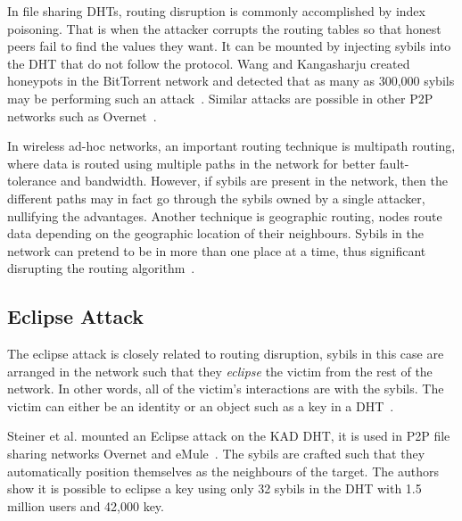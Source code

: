 In file sharing DHTs, routing disruption is commonly
accomplished by index poisoning. That is when the attacker corrupts the routing
tables so that honest peers fail to find the values they want. It can be mounted
by injecting sybils into the DHT that do not follow the protocol. Wang and
Kangasharju created honeypots in the BitTorrent network and detected that as
many as 300,000 sybils may be performing such an attack~\cite{wang2012real}.
Similar attacks are possible in other P2P networks such as
Overnet~\cite{liang2006index}.

In wireless ad-hoc networks, an important routing technique is multipath
routing, where data is routed using multiple paths in the network for better
fault-tolerance and bandwidth. However, if sybils are present in the network,
then the different paths may in fact go through the sybils owned by a single
attacker, nullifying the advantages. Another technique is geographic routing,
nodes route data depending on the geographic location of their neighbours.
Sybils in the network can pretend to be in more than one place at a time, thus
significant disrupting the routing algorithm~\cite{karlof2003secure}.

\subsection{Eclipse Attack}
The eclipse attack is closely related to routing disruption, sybils in this case
are arranged in the network such that they \emph{eclipse} the victim from the
rest of the network. In other words, all of the victim's interactions are with
the sybils. The victim can either be an identity or an object such as a key in a
DHT~\cite{singh2006eclipse}.

Steiner et al. mounted an Eclipse attack on the KAD DHT, it is used in P2P file
sharing networks Overnet and eMule~\cite{steiner2007exploiting}. The sybils are
crafted such that they automatically position themselves as the neighbours of
the target. The authors show it is possible to eclipse a key using only 32
sybils in the DHT with 1.5 million users and 42,000 key.

